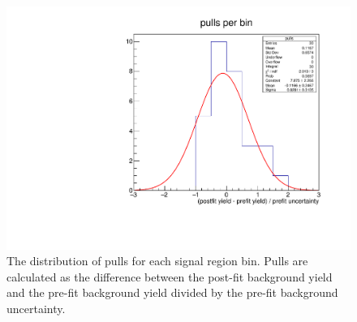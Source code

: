 \begin{figure}[hbtp]
\centering
\includegraphics[scale=0.3]{figures/results/pullsPerBin.pdf}
\caption{The distribution of pulls for each signal region bin. Pulls are calculated as the difference between the post-fit background yield and the pre-fit background yield divided by the pre-fit background uncertainty.}
\label{pre_postfit_prediction_pulls}
\end{figure}